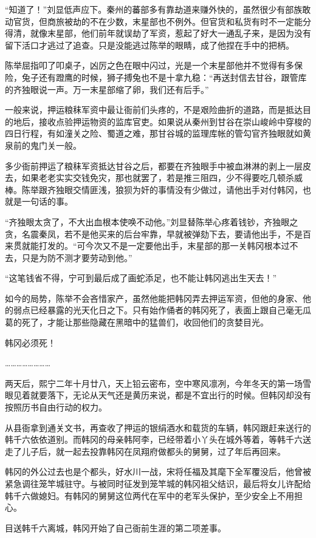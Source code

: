 “知道了！”刘显低声应下。秦州的蕃部多有靠劫道来赚外快的，虽然很少有部族敢动官货，但商旅被劫的不在少数，末星部也不例外。但官货和私货有时不一定能分得清，就像末星部，他们前年就误劫了军资，惹起了好大一通乱子来，是因为没有留下活口才逃过了追查。只是没能逃过陈举的眼睛，成了他捏在手中的把柄。

陈举屈指叩了叩桌子，凶厉之色在眼中闪过，光是一个末星部他并不觉得有多保险，兔子还有蹬鹰的时候，狮子搏兔也不是十拿九稳：“再送封信去甘谷，跟管库的齐独眼说一声。万一末星部缩了卵，我们还有后手。”

一般来说，押运粮秣军资中最让衙前们头疼的，不是艰险曲折的道路，而是抵达目的地后，接收点验押运物资的监库官吏。如果说从秦州到甘谷在崇山峻岭中穿梭的四日行程，有如潼关之险、蜀道之难，那甘谷城的监理库帐的管勾官齐独眼就如黄泉前的鬼门关一般。

多少衙前押运了粮秣军资抵达甘谷之后，都要在齐独眼手中被血淋淋的剥上一层皮去，如果老老实实交钱免灾，那也就罢了，若是推三阻四，少不得要吃几顿杀威棒。陈举跟齐独眼交情匪浅，狼狈为奸的事情没有少做过，请他出手对付韩冈，也就是一句话的事。

“齐独眼太贪了，不大出血根本使唤不动他。”刘显替陈举心疼着钱钞，齐独眼之贪，名震秦凤，若不是他买来的后台牢靠，早就被弹劾下去，要请他出手，不是百来贯就能打发的。“可今次又不是一定要他出手，末星部的那一关韩冈根本过不去，只是为防不测才要劳动到他。”

“这笔钱省不得，宁可到最后成了画蛇添足，也不能让韩冈逃出生天去！”

如今的局势，陈举不会吝惜家产，虽然他能把韩冈弄去押运军资，但他的身家、他的弱点已经暴露的光天化日之下。只有始作俑者的韩冈死了，表面上跟自己毫无瓜葛的死了，才能让那些隐藏在黑暗中的猛兽们，收回他们的贪婪目光。

韩冈必须死！

……………………

两天后，熙宁二年十月廿八，天上铅云密布，空中寒风凛冽，今年冬天的第一场雪眼见着就要落下，无论从天气还是黄历来说，都是不宜出行的时候。但韩冈却没有按照历书自由行动的权力。

从县衙拿到通关文书，再查收了押运的银绢酒水和载货的车辆，韩冈跟赶来送行的韩千六依依道别。而韩冈的母亲韩阿李，已经带着小丫头在城外等着，等韩千六送走了儿子后，就一起去投靠韩冈在凤翔府做都头的舅舅，过了年后再回来。

韩冈的外公过去也是个都头，好水川一战，宋将任福及其麾下全军覆没后，他曾被紧急调往笼竿城驻守。与被同时征发到笼竿城的韩冈祖父结识，最后将女儿许配给韩千六做媳妇。有韩冈的舅舅这位两代在军中的老军头保护，至少安全上不用担心。

目送韩千六离城，韩冈开始了自己衙前生涯的第二项差事。

